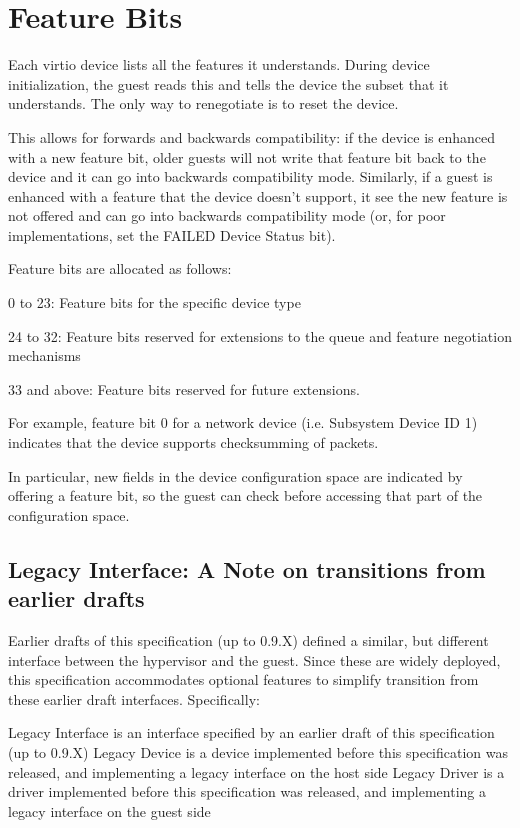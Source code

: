 \section{Feature Bits}\label{sec:Basic Facilities of a Virtio Device / Feature Bits}

Each virtio device lists all the features it understands.  During
device initialization, the guest reads this and tells the device the
subset that it understands.  The only way to renegotiate is to reset
the device.

This allows for forwards and backwards compatibility: if the device is
enhanced with a new feature bit, older guests will not write that
feature bit back to the device and it can go into backwards
compatibility mode. Similarly, if a guest is enhanced with a feature
that the device doesn't support, it see the new feature is not offered
and can go into backwards compatibility mode (or, for poor
implementations, set the FAILED Device Status bit).

Feature bits are allocated as follows:

  0 to 23: Feature bits for the specific device type

  24 to 32: Feature bits reserved for extensions to the queue and
  feature negotiation mechanisms

  33 and above: Feature bits reserved for future extensions.

For example, feature bit 0 for a network device (i.e. Subsystem
Device ID 1) indicates that the device supports checksumming of
packets.

In particular, new fields in the device configuration space are
indicated by offering a feature bit, so the guest can check
before accessing that part of the configuration space.

\subsection{Legacy Interface: A Note on transitions from earlier drafts}\label{sec:Basic Facilities of a Virtio Device / Feature Bits / Legacy Interface: A Note on transitions from earlier drafts}

Earlier drafts of this specification (up to 0.9.X) defined a similar, but
different interface between the hypervisor and the guest.
Since these are widely deployed, this specification
accommodates optional features to simplify transition
from these earlier draft interfaces. Specifically:

Legacy Interface
        is an interface specified by an earlier draft of this specification
        (up to 0.9.X)
Legacy Device
        is a device implemented before this specification was released,
        and implementing a legacy interface on the host side
Legacy Driver
        is a driver implemented before this specification was released,
        and implementing a legacy interface on the guest side


